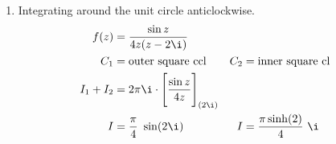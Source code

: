 \begin{enumerate}
    \item Integrating around the unit circle anticlockwise.
          \begin{align}
              f(z)      & = \frac{\sin z}{4z(z - 2\i)}                              \\
              C_1       & = \text{outer square ccl}                               &
              C_2       & = \text{inner square cl}                                  \\
              I_1 + I_2 & = 2\pi \i \cdot \Bigg[ \frac{\sin z}{4z} \Bigg]_{(2\i)}   \\
              I         & = \frac{\pi}{4}\ \sin(2\i)                              &
              I         & = \frac{\pi \sinh(2)}{4}\ \i
          \end{align}


\end{enumerate}
